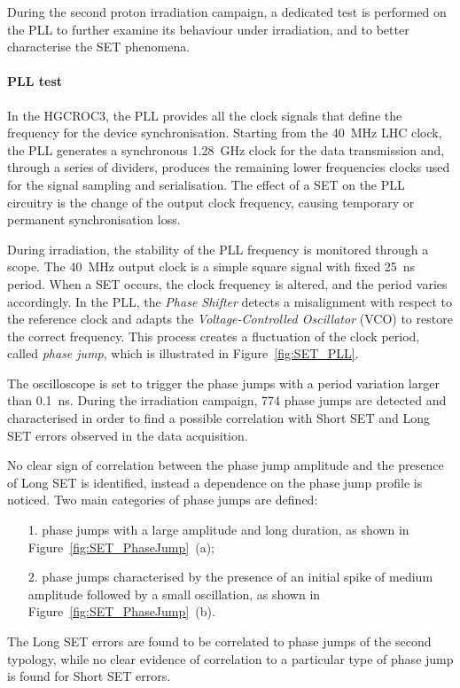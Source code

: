 \bigbreak

During the second proton irradiation campaign, a dedicated test is performed on the PLL to further examine its behaviour under irradiation, and to better characterise the SET phenomena.

\paragraph{PLL test}

In the HGCROC3, the PLL provides all the clock signals that define the frequency for the device synchronisation. Starting from the 40~MHz LHC clock, the PLL generates a synchronous 1.28~GHz clock for the data transmission and, through a series of dividers, produces the remaining lower frequencies clocks used for the signal sampling and serialisation. The effect of a SET on the PLL circuitry is the change of the output clock frequency, causing temporary or permanent synchronisation loss.

During irradiation, the stability of the PLL frequency is monitored through a scope. The 
40~MHz output clock is a simple square signal with fixed 25~ns period.
When a SET occurs, the clock frequency is altered, and the period varies accordingly. 
In the PLL, the \textit{Phase Shifter} detects a misalignment with respect to the reference clock and adapts the \textit{Voltage-Controlled Oscillator} (VCO) to restore the correct frequency. This process creates a fluctuation of the clock period, called \textit{phase jump}, which is illustrated in Figure~\ref{fig:SET_PLL}.

The oscilloscope is set to trigger the phase jumps with a period variation larger than 0.1~ns. During the irradiation campaign, 774 phase jumps are detected and characterised in order to find a possible correlation with Short SET and Long SET errors observed in the data acquisition.

No clear sign of correlation between the phase jump amplitude and the presence of Long SET is identified, instead a dependence on the phase jump profile is noticed.
Two main categories of phase jumps are defined: 
\begin{itemize}
    \item [1.] phase jumps with a large amplitude and long duration, as shown in Figure~\ref{fig:SET_PhaseJump}~(a);
    \item [2.] phase jumps characterised by the presence of an initial spike of medium amplitude followed by a small oscillation, as shown in Figure~\ref{fig:SET_PhaseJump}~(b).
\end{itemize}
The Long SET errors are found to be correlated to phase jumps of the second typology, while no clear evidence of correlation to a particular type of phase jump is found for Short SET errors.

